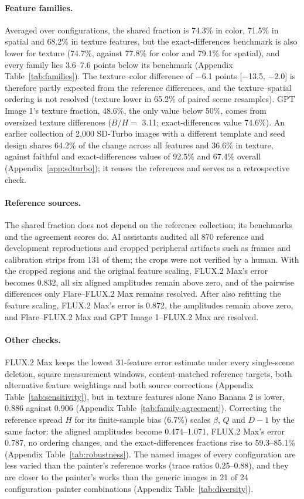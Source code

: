 \documentclass[10pt]{article}
\begin{document}
\paragraph{Feature families.} Averaged over configurations, the shared fraction is 74.3\% in color,
71.5\% in spatial and 68.2\% in texture features, but the exact-differences benchmark is also lower
for texture (74.7\%, against 77.8\% for color and 79.1\% for spatial), and every family lies 3.6--7.6
points below its benchmark (Appendix Table~\ref{tab:families}). The texture--color difference of
$-$6.1 points [$-$13.5, $-$2.0] is therefore partly expected from the reference differences, and the
texture--spatial ordering is not resolved (texture lower in 65.2\% of paired scene resamples). GPT
Image 1's texture fraction, 48.6\%, the only value below 50\%, comes from oversized texture
differences ($B/H=$ 3.11; exact-differences value 74.6\%). An earlier collection of 2,000 SD-Turbo
images with a different template and seed design shares 64.2\% of the change across all features
and 36.6\% in texture, against faithful and exact-differences values of 92.5\% and 67.4\% overall
(Appendix~\ref{app:sdturbo}); it reuses the references and serves as a retrospective check.

\paragraph{Reference sources.} The shared fraction does not depend on the reference collection; its
benchmarks and the agreement scores do. AI assistants audited all 870 reference and development
reproductions and cropped peripheral artifacts such as frames and calibration strips from 131 of
them; the crops were not verified by a human. With the cropped regions and the original feature
scaling, FLUX.2 Max's error becomes 0.832, all six aligned amplitudes remain above zero, and of the
pairwise differences only Flare--FLUX.2 Max remains resolved. After also refitting the feature
scaling, FLUX.2 Max's error is 0.872, the amplitudes remain above zero, and Flare--FLUX.2 Max and GPT
Image 1--FLUX.2 Max are resolved.

\paragraph{Other checks.} FLUX.2 Max keeps the lowest 31-feature error estimate under every
single-scene deletion, square measurement windows, content-matched reference targets, both
alternative feature weightings and both source corrections (Appendix Table~\ref{tab:sensitivity}),
but in texture features alone Nano Banana 2 is lower, 0.886 against 0.906 (Appendix
Table~\ref{tab:family-agreement}). Correcting the reference spread $H$ for its finite-sample bias
(6.7\%) scales $\beta$, $Q$ and $D-1$ by the same factor: the aligned amplitudes become
0.474--1.071, FLUX.2 Max's error 0.787, no ordering changes, and the exact-differences fractions
rise to 59.3--85.1\% (Appendix Table~\ref{tab:robustness}). The named images of every configuration
are less varied than the painter's reference works (trace ratios 0.25--0.88), and they are closer
to the painter's works than the generic images in 21 of 24 configuration--painter combinations
(Appendix Table~\ref{tab:diversity}).
\end{document}
